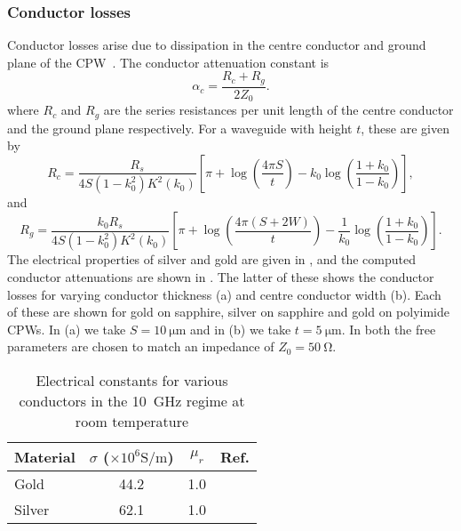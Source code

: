 \subsubsection{Conductor losses}

Conductor losses arise due to dissipation in the centre conductor and ground
plane of the CPW~\cite{Simons2004}.  The conductor attenuation constant is
%
\begin{equation}
  \alpha_c = \frac{R_c +R_g}{2Z_0}.
\end{equation}
%
where $R_c$ and $R_g$ are the series resistances per unit length of the centre
conductor and the ground plane respectively.
%
For a waveguide with height $t$, these are given by
%
\begin{equation}
  R_c = \frac{R_s}{4 S(1-k_0^2)K^2(k_0)}\left[ \pi + \log\left(\frac{4\pi
  S}{t}\right) - k_0\log\left(\frac{1+k_0}{1-k_0}\right) \right],
\end{equation}
%
and
%
\begin{equation}
  R_g = \frac{k_0 R_s}{4S(1-k_0^2)K^2(k_0)}\left[\pi +
  \log\left(\frac{4\pi(S+2W)}{t}\right) -
  \frac{1}{k_0}\log\left(\frac{1+k_0}{1-k_0}\right)\right].
\end{equation}
%
The electrical properties of silver and gold are given in
, and the computed conductor attenuations are
shown in . The latter of these shows the
conductor losses for varying conductor thickness (a) and centre conductor width
(b). Each of these are shown for gold on sapphire, silver on sapphire and gold
on polyimide CPWs. In (a) we take $S=\SI{10}{\micro\meter}$ and in (b) we take
$t=\SI{5}{\micro\meter}$. In both the free parameters are chosen to match an
impedance of $Z_0=\SI{50}{\ohm}$.

% 
\begin{table}[tb!]
  \caption{Electrical constants for various conductors in the
  \SI{10}{\giga\hertz} regime at room temperature}
\centering
\begin{tabular}{l c c c}
\hline\hline
Material & $\sigma$ ($\times10^6\si{\siemens\per\meter}$) & $\mu_r$ & Ref. \\ [ 0.5ex]
\hline
  Gold & 44.2 & 1.0 & \cite{edwards2016foundations}\\
  Silver & 62.1 & 1.0 & \cite{edwards2016foundations}\\
\hline
\end{tabular}
\label{mws:table:metalprops}
\end{table}

